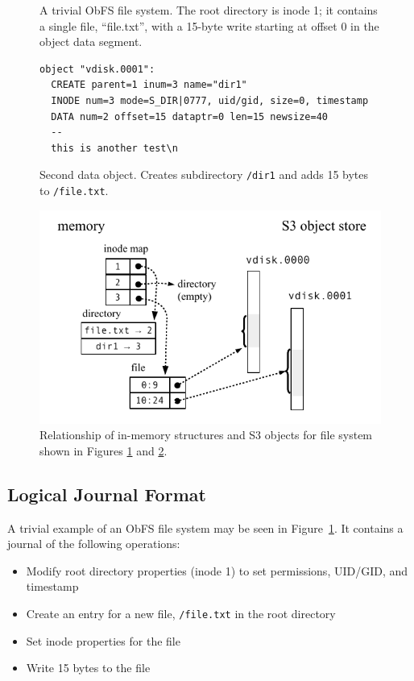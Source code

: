 \documentclass[sigconf,anonymous,10pt]{acmart}
\begin{document}
\begin{CCSXML}
\begin{figure}
  \caption{ A trivial ObFS file system. \rm The root directory is inode 1; it contains a single file, ``file.txt'', with a 15-byte write starting at offset 0 in the object data segment.} 
  \label{figure:journal1}
\end{figure}

\begin{figure}
\begin{framed}
 {\footnotesize
\begin{verbatim}
object "vdisk.0001":
  CREATE parent=1 inum=3 name="dir1"
  INODE num=3 mode=S_DIR|0777, uid/gid, size=0, timestamp
  DATA num=2 offset=15 dataptr=0 len=15 newsize=40
  --
  this is another test\n
\end{verbatim} }
\end{framed}
  \caption{Second data object. \rm Creates subdirectory \texttt{/dir1} and adds 15 bytes to \texttt{/file.txt}.}
  \label{figure:journal2}
\end{figure}


\begin{figure}
\centering
\includegraphics[width=0.95\columnwidth]{figures/obfs.pdf}
\caption{Relationship of in-memory structures and S3 objects for file system shown in Figures \ref{figure:journal1} and \ref{figure:journal2}.}
\label{figure:picture}
\end{figure}

\subsection{Logical Journal Format}

A trivial example of an ObFS file system may be seen in Figure~\ref{figure:journal1}.
It contains a journal of the following operations:
\begin{itemize}[nosep]
\item Modify root directory properties (inode 1) to set permissions, UID/GID, and timestamp
\item Create an entry for a new file, \texttt{/file.txt} in the root directory
\item Set inode properties for the file
\item Write 15 bytes to the file
\end{itemize}


\end{CCSXML}
\end{document}
